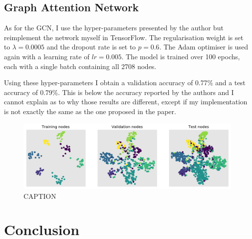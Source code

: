 \documentclass[12pt]{article}
\theoremstyle{definition}
\begin{document}
\subsection{Graph Attention Network}
As for the GCN, I use the hyper-parameters presented by the author but reimplement the network myself in TensorFlow. The regularisation weight is set to $\lambda = 0.0005$ and the dropout rate is set to $p=0.6$. The Adam optimiser \cite{kingma2014adam} is used again with a learning rate of $\textit{lr} = 0.005$. The model is trained over 100 epochs, each with a single batch containing all 2708 nodes.

Using these hyper-parameters I obtain a validation accuracy of 0.77\% and a test accuracy of 0.79\%. This is below the accuracy reported by the authors and I cannot explain as to why those results are different, except if my implementation is not exactly the same as the one proposed in the paper. 
\begin{figure}[h]
	\includegraphics[width=1.0\textwidth]{gat/visualisation_tsne}
	\centering
	\caption{CAPTION}
	\label{fig/gcn_tsne}
\end{figure}
\section{Conclusion}



\end{document}
